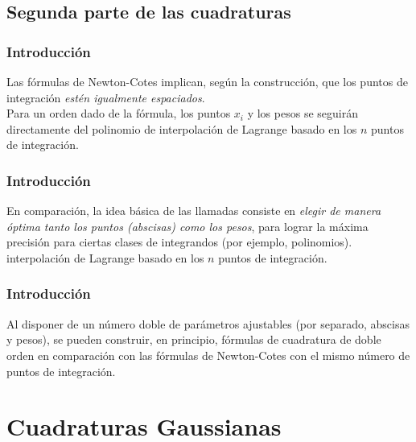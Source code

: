 \subsection{Segunda parte de las cuadraturas}
\begin{frame}
\frametitle{Introducción}
Las fórmulas de Newton-Cotes implican, según la construcción, que los puntos de integración \emph{estén  igualmente espaciados}.
\\
\bigskip
Para un orden dado de la fórmula, los puntos $x_{i}$ y los pesos se seguirán directamente del polinomio de interpolación de Lagrange basado en los $n$ puntos de integración.
\end{frame}
\begin{frame}
\frametitle{Introducción}
En comparación, la idea básica de las llamadas  consiste en \emph{elegir de manera óptima tanto los puntos (abscisas) como los pesos}, para lograr la máxima precisión para ciertas clases de integrandos (por ejemplo, polinomios).
interpolación de Lagrange basado en los $n$ puntos de integración.
\end{frame}
\begin{frame}
\frametitle{Introducción}
Al disponer de un número doble de parámetros ajustables (por separado, abscisas y pesos), se pueden construir, en principio, fórmulas de cuadratura de doble orden en comparación con las fórmulas de Newton-Cotes con el mismo número de puntos de integración.
\end{frame}
\section{Cuadraturas Gaussianas}
